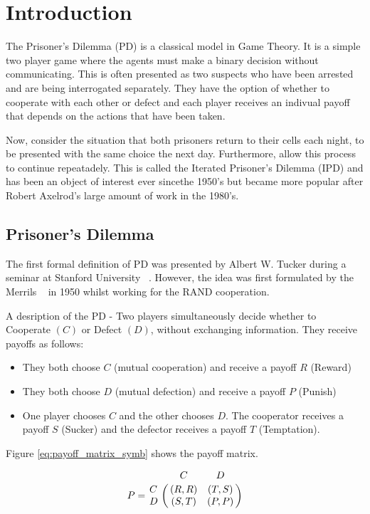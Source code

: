 
\chapter{Introduction}\label{cha:introduction}

The Prisoner's Dilemma (PD) is a classical model in Game Theory.
It is a simple two player game where the agents must make a binary decision without communicating.
This is often presented as two suspects who have been arrested and are being interrogated separately.
They have the option of whether to cooperate with each other or defect and each player receives an indivual payoff that depends on the actions that have been taken.

Now, consider the situation that both prisoners return to their cells each night, to be presented with the same choice the next day.
Furthermore, allow this process to continue repeatadely. 
This is called the Iterated Prisoner's Dilemma (IPD) and has been an object of interest ever sincethe 1950's but became more popular after Robert Axelrod's large amount of work in the 1980's.


\section{Prisoner's Dilemma}
The first formal definition of PD was presented by Albert W. Tucker during a seminar at Stanford University ~\cite{Gass2005}.
However, the idea was first formulated by the Merrils ~\cite{Flood1958} in 1950 whilst working for the RAND cooperation.

A desription of the PD - Two players simultaneously decide whether to Cooperate $(C)$ or Defect $(D)$, without exchanging information.
They receive payoffs as follows:

\begin{itemize}
\item They both choose $C$ (mutual cooperation) and receive a payoff $R$ (Reward)
\item They both choose $D$ (mutual defection) and receive a payoff $P$ (Punish)
\item One player chooses $C$ and the other chooses $D$. The cooperator receives a payoff $S$ (Sucker) and the defector receives a payoff $T$ (Temptation).
\end{itemize}

Figure \ref{eq:payoff_matrix_symb} shows the payoff matrix.

\begin{equation}\label{eq:payoff_matrix_symb}
% 
P = \bordermatrix{~ & C & D \cr
                  C & (R, R) & (T, S) \cr
                  D & (S, T) & (P, P) \cr}
% 
\end{equation}


